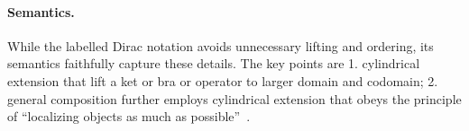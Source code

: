 
\paragraph*{Semantics.} While the labelled Dirac notation avoids unnecessary lifting and ordering, its semantics faithfully capture these details. The key points are 1. cylindrical extension that lift a ket or bra or operator to larger domain and codomain; 2. general composition further employs cylindrical extension that obeys the principle of ``localizing objects as much as possible''~\cite{Zhou2023}.

